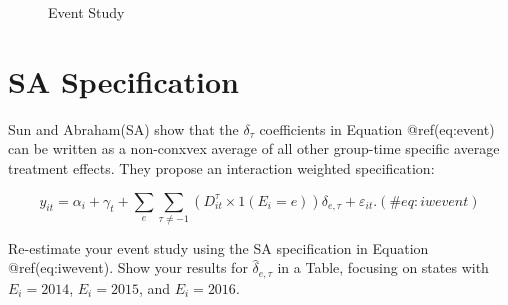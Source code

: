 \documentclass[
  12pt,
]{article}
\begin{document}
\begin{figure}
\caption{Event Study}\label{fig:Fig-4}
\end{figure}
\newpage

\hypertarget{sa-specification}{%
\section{SA Specification}\label{sa-specification}}

Sun and Abraham(SA) show that the \(\delta_{\tau}\) coefficients in
Equation @ref(eq:event) can be written as a non-conxvex average of all
other group-time specific average treatment effects. They propose an
interaction weighted specification:

\begin{equation}
y_{it} = \alpha_{i} + \gamma_{t} +\sum_{e} \sum_{\tau \neq -1} \left(D_{it}^{\tau} \times 1(E_{i}=e)\right) \delta_{e, \tau} + \varepsilon_{it}.
(\#eq:iwevent)
\end{equation}

Re-estimate your event study using the SA specification in Equation
@ref(eq:iwevent). Show your results for \(\hat{\delta}_{e, \tau}\) in a
Table, focusing on states with \(E_{i}=2014\), \(E_{i}=2015\), and
\(E_{i}=2016\).
\end{document}
